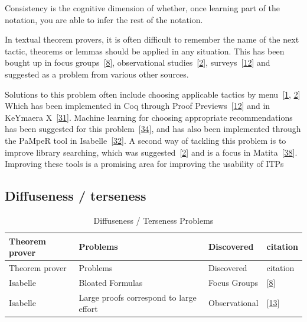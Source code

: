 \documentclass[
]{article}
\begin{document}
Consistency is the cognitive dimension of whether, once learning part of
the notation, you are able to infer the rest of the notation.

In textual theorem provers, it is often difficult to remember the name
of the next tactic, theorems or lemmas should be applied in any
situation. This has been bought up in focus
groups~{[}\protect\hyperlink{ref-beckert_usability_2015}{8}{]},
observational
studies~{[}\protect\hyperlink{ref-aitken_analysis_2000}{2}{]},
surveys~{[}\protect\hyperlink{ref-berman_development_2014}{12}{]} and
suggested as a problem from various other sources.

Solutions to this problem often include choosing applicable tactics by
menu~{[}\protect\hyperlink{ref-aitken_interactive_1998}{1},
\protect\hyperlink{ref-aitken_analysis_2000}{2}{]} Which has been
implemented in Coq through Proof
Previews~{[}\protect\hyperlink{ref-berman_development_2014}{12}{]} and
in KeYmaera X~{[}\protect\hyperlink{ref-mitsch_keymaera_2017}{31}{]}.
Machine learning for choosing appropriate recommendations has been
suggested for this
problem~{[}\protect\hyperlink{ref-ringer_replica_2020}{34}{]}, and has
also been implemented through the PaMpeR tool in
Isabelle~{[}\protect\hyperlink{ref-nagashima_pamper_2018}{32}{]}. A
second way of tackling this problem is to improve library searching,
which was
suggested~{[}\protect\hyperlink{ref-aitken_analysis_2000}{2}{]} and is a
focus in
Matita~{[}\protect\hyperlink{ref-tassi_interactive_2008}{38}{]}.
Improving these tools is a promising area for improving the usability of
ITPs

\hypertarget{diffuseness-terseness}{%
\subsection{Diffuseness / terseness}\label{diffuseness-terseness}}

\hypertarget{tbl:diffuseness}{}
\begin{longtable}[]{@{}llll@{}}
\caption{\label{tbl:diffuseness}Diffuseness / Terseness
Problems}\tabularnewline
\toprule
Theorem prover & Problems & Discovered & citation \\
\midrule
\endfirsthead
\toprule
Theorem prover & Problems & Discovered & citation \\
\midrule
\endhead
Isabelle & Bloated Formulas & Focus Groups &
{[}\protect\hyperlink{ref-beckert_usability_2015}{8}{]} \\
Isabelle & Large proofs correspond to large effort & Observational &
{[}\protect\hyperlink{ref-bourke_challenges_2012}{13}{]} \\
\bottomrule
\end{longtable}
\end{document}
